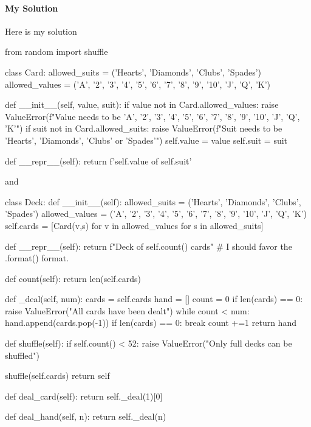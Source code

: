 \paragraph{My Solution}

Here is my solution
\begin{listing}{1}
from random import shuffle

class Card:
    allowed_suits = ('Hearts', 'Diamonds', 'Clubs', 'Spades')
    allowed_values =  ('A', '2', '3', '4', '5', '6', 
    '7', '8', '9', '10', 'J', 'Q', 'K')

    def __init__(self, value, suit):
        if value not in Card.allowed_values:            
            raise ValueError(f"Value needs to be 'A', '2', '3', '4', '5', 
            '6', '7', '8', '9', '10', 'J', 'Q', 'K'")
        if suit not in Card.allowed_suits:
            raise ValueError(f"Suit needs to be 'Hearts', 
            'Diamonds', 'Clubs' or 'Spades'")
        self.value = value
        self.suit = suit

    def __repr__(self):
        return f'{self.value} of {self.suit}'      
\end{listing}
and 
\begin{listingcont}
class Deck:
    def __init__(self):
        allowed_suits = ('Hearts', 'Diamonds', 'Clubs', 'Spades')
        allowed_values =  ('A', '2', '3', '4', '5', '6', '7', '8', '9',
        '10', 'J', 'Q', 'K')        
        self.cards = [Card(v,s) for v in allowed_values for s in allowed_suits]

    def __repr__(self):
        return f"Deck of {self.count()} cards"
        # I should favor the .format() format.
                    
    def count(self):
        return len(self.cards)

    def _deal(self, num):        
        cards = self.cards 
        hand = []
        count = 0
        if len(cards) == 0:
            raise ValueError("All cards have been dealt")
        while count < num:
            hand.append(cards.pop(-1))
            if len(cards) == 0:
                break
            count +=1
        return hand

    def shuffle(self):    
        if self.count() < 52:
            raise ValueError("Only full decks can be shuffled")

        shuffle(self.cards)
        return self            

    def deal_card(self):
        return self._deal(1)[0]

    def deal_hand(self, n):
        return self._deal(n)    
\end{listingcont}

